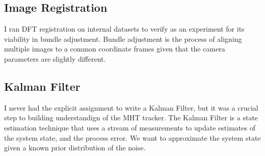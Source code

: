 \documentclass[12pt]{article}
\begin{document}
\subsection{Image Registration}
I ran DFT registration on internal datasets to verify as an experiment for its viability in bundle adjustment. Bundle adjustment is the process of aligning multiple images to a common coordinate frames given that the camera parameters are slightly different.

\subsection{Kalman Filter}
I never had the explicit assignment to write a Kalman Filter, but it was a crucial step to building understandign of the MHT tracker. The Kalman Filter is a state estimation technique that uses a stream of measurements to update estimates of the system state, and the process error. We want to approximate the system state given a known prior distribution of the noise. 

\printbibliography
\end{document}
